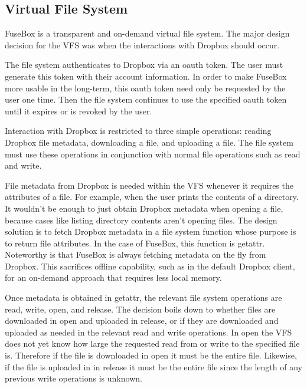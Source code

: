 \documentclass[11pt,twocolumn,letterpaper]{article}
\newcommand{\appname}{FuseBox }
\newcommand{\appnameWOspace}{FuseBox}
\begin{document}
\subsection{Virtual File System}
\label{sec:fs}
\appname is a transparent and on-demand virtual file system. The major design
decision for the VFS was when the interactions with Dropbox should
occur. 
\par The file system authenticates to Dropbox via an oauth token. The user must
generate this token with their account information. In order to make
\appname more usable in the long-term, this oauth token need only be
requested by the user one time. Then the file system continues to
use the specified oauth token until it expires or is
revoked by the user. 
\par Interaction with Dropbox is restricted to three simple
operations: reading Dropbox file metadata, downloading a file, 
and uploading a file. The file system must use these operations in
conjunction with normal file operations such as read and write. 
\par File metadata from Dropbox is needed within the VFS whenever it
requires the attributes of a file. For example, when the user prints
the contents of a directory. It wouldn't be enough to just obtain Dropbox
metadata when opening a file, because cases like listing directory contents
aren't opening files. The design solution is to fetch Dropbox metadata
in a file system function whose purpose is to return file
attributes. In the case of \appnameWOspace, this function is getattr. 
Noteworthy is that \appname is always fetching metadata on the fly
from Dropbox. This sacrifices offline capability, such as in the
default Dropbox client, for an on-demand approach that requires less
local memory. 

\par Once metadata is obtained in getattr, the relevant file system 
operations are read, write, open, and
release. The decision boils down to whether files are downloaded in open and
uploaded in release, or if they are downloaded and uploaded as needed
in the relevant read and write operations.
In open the VFS does not yet know how large the requested read from or
write to the specified file is. Therefore if the file is downloaded in
open it must be the entire file. Likewise, if the file is uploaded in
in release it must be the entire file since the length of any previous
write operations is unknown. 
\end{document}
